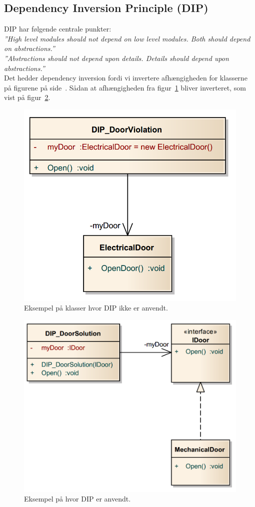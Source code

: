 \subsection{Dependency Inversion Principle (DIP)}
DIP har følgende centrale punkter:\\

\textit{''High level modules should not depend on low level modules. Both should depend on abstractions.''}\\

\textit{''Abstractions should not depend upon details. Details should depend upon abstractions.''}\\

Det hedder dependency inversion fordi vi invertere afhængigheden for klasserne på figurene på side~\pageref{fig:dipright}. Sådan at afhængigheden fra figur~\ref{fig:dipwrong} bliver inverteret, som vist på figur~\ref{fig:dipright}.\\

\begin{figure}[h]
	\centering
	\includegraphics[width=0.5\linewidth]{figs/DIP/dipwrong}
	\caption[DIP eksempel 1]{Eksempel på klasser hvor DIP ikke er anvendt.}
	\label{fig:dipwrong}
\end{figure}

\begin{figure}[h]
	\centering
	\includegraphics[width=0.5\linewidth]{figs/DIP/dipright}
	\caption[DIP eksempel 2]{Eksempel på hvor DIP er anvendt.}
	\label{fig:dipright}
\end{figure}

